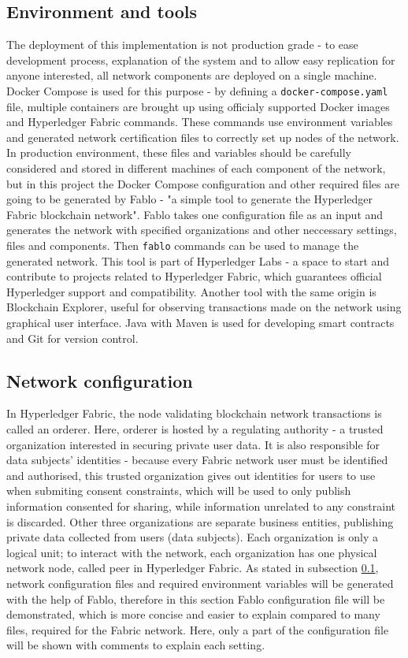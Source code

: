 \documentclass[12pt]{article}
\begin{document}
    \subsection{Environment and tools}
    \label{subsec:environment}
    The deployment of this implementation is not production grade - to ease development process, explanation of the system and to allow easy replication for anyone interested, all network components are deployed on a single machine. Docker Compose is used for this purpose - by defining a \lstinline{docker-compose.yaml} file, multiple containers are brought up using officialy supported Docker images and Hyperledger Fabric commands. These commands use environment variables and generated network certification files to correctly set up nodes of the network. In production environment, these files and variables should be carefully considered and stored in different machines of each component of the network, but in this project the Docker Compose configuration and other required files are going to be generated by Fablo - "a simple tool to generate the Hyperledger Fabric blockchain network"\cite{fablo}. Fablo takes one configuration file as an input and generates the network with specified organizations and other neccessary settings, files and components. Then \lstinline{fablo} commands can be used to manage the generated network. This tool is part of Hyperledger Labs - a space to start and contribute to projects related to Hyperledger Fabric, which guarantees official Hyperledger support and compatibility. Another tool with the same origin is Blockchain Explorer\cite{explorer}, useful for observing transactions made on the network using graphical user interface. Java with Maven is used for developing smart contracts and Git for version control.

    \subsection{Network configuration}
    \label{subsec:network}
    In Hyperledger Fabric, the node validating blockchain network transactions is called an orderer. Here, orderer is hosted by a regulating authority - a trusted organization interested in securing private user data. It is also responsible for data subjects' identities - because every Fabric network user must be identified and authorised, this trusted organization gives out identities for users to use when submiting consent constraints, which will be used to only publish information consented for sharing, while information unrelated to any constraint is discarded. Other three organizations are separate business entities, publishing private data collected from users (data subjects). Each organization is only a logical unit; to interact with the network, each organization has one physical network node, called peer in Hyperledger Fabric. As stated in subsection \ref{subsec:environment}, network configuration files and required environment variables will be generated with the help of Fablo, therefore in this section Fablo configuration file will be demonstrated, which is more concise and easier to explain compared to many files, required for the Fabric network. Here, only a part of the configuration file will be shown with comments to explain each setting.
\end{document}
